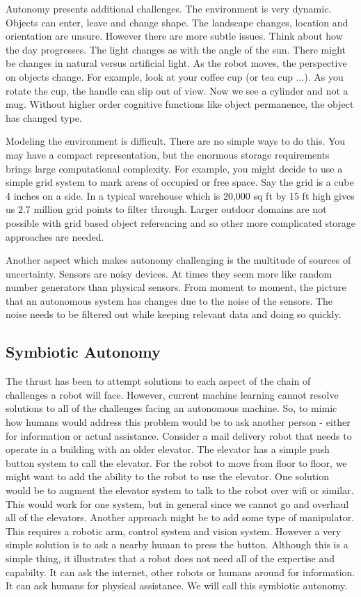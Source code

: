 Autonomy presents additional challenges. The environment is very
dynamic. Objects can enter, leave and change shape. The landscape
changes, location and orientation are unsure. However there are more
subtle issues. Think about how the day progresses. The light changes as
with the angle of the sun. There might be changes in natural versus
artificial light. As the robot moves, the perspective on objects change.
For example, look at your coffee cup (or tea cup ...). As you rotate the
cup, the handle can slip out of view. Now we see a cylinder and not a
mug. Without higher order cognitive functions like object permanence,
the object has changed type.

Modeling the environment is difficult. There are no simple ways to do
this. You may have a compact representation, but the enormous storage
requirements brings large computational complexity. For example, you
might decide to use a simple grid system to mark areas of occupied or
free space. Say the grid is a cube 4 inches on a side. In a typical
warehouse which is 20,000 sq ft by 15 ft high gives us 2.7 million grid
points to filter through. Larger outdoor domains are not possible with
grid based object referencing and so other more complicated storage
approaches are needed.

Another aspect which makes autonomy challenging is the multitude of
sources of uncertainty. Sensors are noisy devices. At times they seem
more like random number generators than physical sensors. From moment to
moment, the picture that an autonomous system has changes due to the
noise of the sensors. The noise needs to be filtered out while keeping
relevant data and doing so quickly.

\hypertarget{symbiotic-autonomy}{%
\subsection{Symbiotic Autonomy}\label{symbiotic-autonomy}}

The thrust has been to attempt solutions to each aspect of the chain of
challenges a robot will face. However, current machine learning cannot
resolve solutions to all of the challenges facing an autonomous machine.
So, to mimic how humans would address this problem would be to ask
another person - either for information or actual assistance. Consider a
mail delivery robot that needs to operate in a building with an older
elevator. The elevator has a simple push button system to call the
elevator. For the robot to move from floor to floor, we might want to
add the ability to the robot to use the elevator. One solution would be
to augment the elevator system to talk to the robot over wifi or
similar. This would work for one system, but in general since we cannot
go and overhaul all of the elevators. Another approach might be to add
some type of manipulator. This requires a robotic arm, control system
and vision system. However a very simple solution is to ask a nearby
human to press the button. Although this is a simple thing, it
illustrates that a robot does not need all of the expertise and
capabilty. It can ask the internet, other robots or humans around for
information. It can ask humans for physical assistance. We will call
this symbiotic autonomy.
